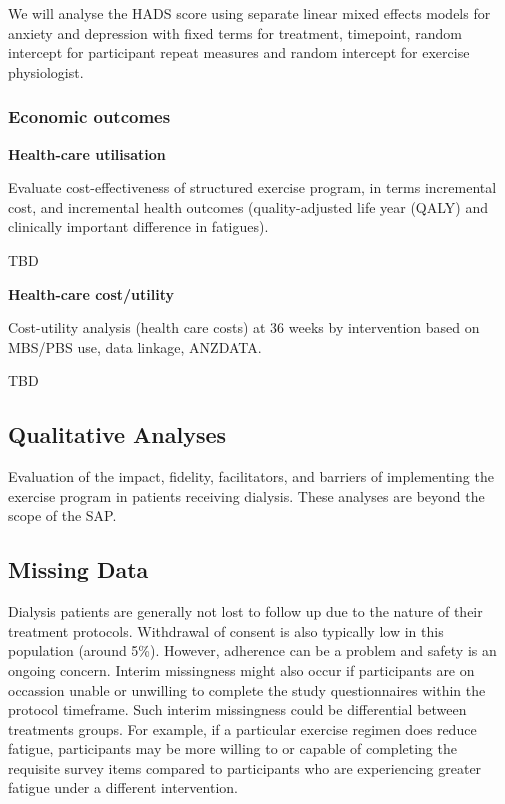 \documentclass[
]{article}
\begin{document}
We will analyse the HADS score using separate linear mixed effects models for anxiety and depression with fixed terms for treatment, timepoint, random intercept for participant repeat measures and random intercept for exercise physiologist.




\hypertarget{economic-outcomes}{%
  \subsubsection{Economic outcomes}\label{economic-outcomes}}

\textbf{Health-care utilisation}

Evaluate cost-effectiveness of structured exercise program, in terms incremental cost, and incremental health outcomes (quality-adjusted life year (QALY) and clinically important difference in fatigues).

TBD

\textbf{Health-care cost/utility}

Cost-utility analysis (health care costs) at 36 weeks by intervention based on MBS/PBS use, data linkage, ANZDATA.

TBD



\hypertarget{qualitative-analyses}{%
  \subsection{Qualitative Analyses}\label{qualitative-analyses}}

Evaluation of the impact, fidelity, facilitators, and barriers of implementing the exercise program in patients receiving dialysis.
These analyses are beyond the scope of the SAP.

\hypertarget{missing-data}{%
  \subsection{Missing Data}\label{missing-data}}

Dialysis patients are generally not lost to follow up due to the nature of their treatment protocols.
Withdrawal of consent is also typically low in this population (around 5\%).
However, adherence can be a problem and safety is an ongoing concern.
Interim missingness might also occur if participants are on occassion unable or unwilling to complete the study questionnaires within the protocol timeframe.
Such interim missingness could be differential between treatments groups.
For example, if a particular exercise regimen does reduce fatigue, participants may be more willing to or capable of completing the requisite survey items compared 
to participants who are experiencing greater fatigue under a different intervention.
\end{document}
